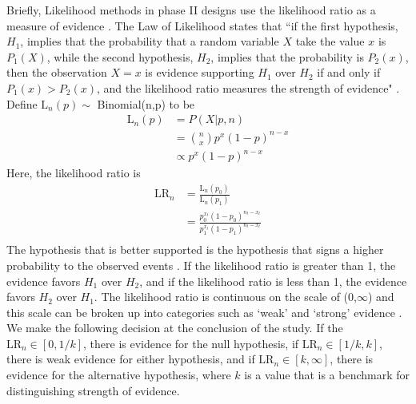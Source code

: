 \documentclass[12pt]{report}\usepackage[]{graphicx}\usepackage[]{color}
\newlength{\li}\setlength{\li}{14.48pt}
\newlength{\di}\setlength{\di}{-3.5mm}
\begin{document}
Briefly, Likelihood methods in phase II designs use the likelihood ratio as a measure of evidence \cite{Ayers}. The Law of Likelihood states that ``if the first hypothesis, $H_1$, implies that the probability that a random variable $X$ take the value $x$ is $P_1(X)$, while the second hypothesis, $H_2$, implies that the probability is $P_2(x)$, then the observation $X=x$ is evidence supporting $H_1$ over $H_2$ if and only if $P_1(x) > P_2(x)$, and the likelihood ratio measures the strength of evidence" \cite{Blume2002}. Define $\mbox{L}_n(p) \sim$ Binomial(n,p) to be 
\begin{equation}
\begin{aligned}
\mbox{L}_n(p) &= P(X \vert p, n) \\
&= {n \choose x} p^x (1-p)^{n-x} \\
& \propto p^x (1-p)^{n-x}
\end{aligned}
\end{equation}
Here, the likelihood ratio is 
\begin{equation}
\begin{aligned}
\mbox{LR}_n & = \frac{\mbox{L}_n(p_0)}{\mbox{L}_n(p_1)} \\
&= \frac{p_0^{x_t}(1-p_0)^{n_t-x_t}}{p_1^{x_t}(1-p_1)^{n_t-x_t}} \\
\end{aligned}
\end{equation}
The hypothesis that is better supported is the hypothesis that signs a higher probability to the observed events \cite{Blume2002}. If the likelihood ratio is greater than 1, the evidence favors $H_1$ over $H_2$, and if the likelihood ratio is less than 1, the evidence favors $H_2$ over $H_1$. The likelihood ratio is continuous on the scale of (0,$\infty$) and this scale can be broken up into categories such as `weak' and `strong' evidence \cite{Blume2002}. We make the following decision at the conclusion of the study. If the $\mbox{LR}_n \in [0, 1/k]$, there is evidence for the null hypothesis, if $\mbox{LR}_n \in [1/k,k]$, there is weak evidence for either hypothesis, and if $\mbox{LR}_n \in [k,\infty]$, there is evidence for the alternative hypothesis, where $k$ is a value that is a benchmark for distinguishing strength of evidence. \\
\end{document}
